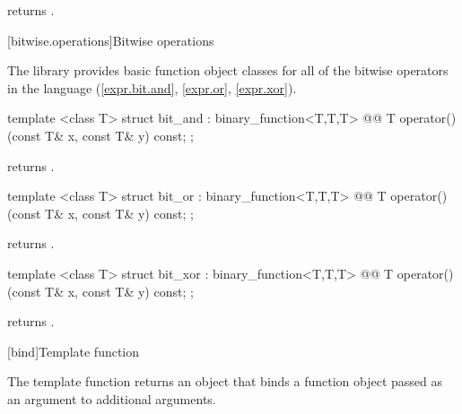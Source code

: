\documentclass[american,twoside]{book}
\begin{document}
\begin{itemdescr}
\pnum
{} returns .
\end{itemdescr}

[bitwise.operations]{Bitwise operations}

\pnum
The library provides basic function object classes for all of the bitwise
operators in the language (\ref{expr.bit.and}, \ref{expr.or}, \ref{expr.xor}).

%
\begin{itemdecl}
template <class T> struct bit_and : binary_function<T,T,T> {
  @@
    T operator()(const T& x, const T& y) const;
};
\end{itemdecl}

\begin{itemdescr}
\pnum
{} returns .
\end{itemdescr}

%
\begin{itemdecl}
template <class T> struct bit_or : binary_function<T,T,T> {
  @@
    T operator()(const T& x, const T& y) const;
};
\end{itemdecl}

\begin{itemdescr}
\pnum
{} returns .
\end{itemdescr}

%
\begin{itemdecl}
template <class T> struct bit_xor : binary_function<T,T,T> {
  @@
    T operator()(const T& x, const T& y) const;
};
\end{itemdecl}

\begin{itemdescr}
\pnum
{} returns .
\end{itemdescr}

\setcounter{subsection}{9}
[bind]{\marktr{}Template function }

\pnum
The template function  returns an object that binds a
function object passed as an argument to additional arguments.

\pnum
{}
\end{document}
